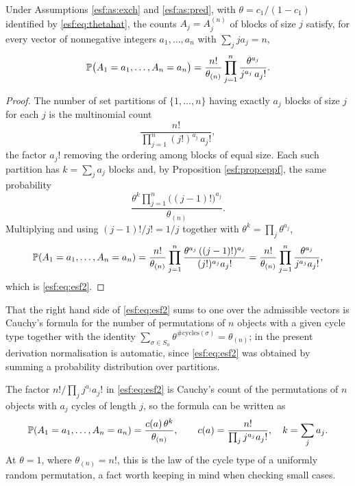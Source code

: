 \begin{theorem}
\label{esf:thm:esf}
Under Assumptions \ref{esf:as:exch} and \ref{esf:as:pred}, with $\theta = c_1/(1-c_1)$
identified by \eqref{esf:eq:thetahat}, the counts $A_j = A_j^{(n)}$ of blocks of size $j$
satisfy, for every vector of nonnegative integers $a_1, \dots, a_n$ with
$\sum_{j} j a_j = n$,
\begin{equation}
\mathbb{P}\bigl( A_1 = a_1, \dots, A_n = a_n \bigr)
= \frac{n!}{\theta_{(n)}} \prod_{j=1}^{n} \frac{\theta^{a_j}}{j^{a_j} \, a_j!}.
\label{esf:eq:esf2}
\end{equation}
\end{theorem}

\begin{proof}
The number of set partitions of $\{1,\dots,n\}$ having exactly $a_j$ blocks of size
$j$ for each $j$ is the multinomial count
\[
\frac{n!}{\prod_{j=1}^{n} (j!)^{a_j} \, a_j!},
\]
the factor $a_j!$ removing the ordering among blocks of equal size. Each such
partition has $k = \sum_j a_j$ blocks and, by Proposition \ref{esf:prop:eppf}, the same
probability
\[
\frac{\theta^{k} \prod_{j=1}^{n} \bigl( (j-1)! \bigr)^{a_j}}{\theta_{(n)}} .
\]
Multiplying and using $(j-1)!/j! = 1/j$ together with $\theta^{k} = \prod_j \theta^{a_j}$,
\[
\mathbb{P}(A_1 = a_1, \dots, A_n = a_n)
= \frac{n!}{\theta_{(n)}} \prod_{j=1}^{n} \frac{\theta^{a_j} \, ((j-1)!)^{a_j}}{(j!)^{a_j} a_j!}
= \frac{n!}{\theta_{(n)}} \prod_{j=1}^{n} \frac{\theta^{a_j}}{j^{a_j} a_j!},
\]
which is \eqref{esf:eq:esf2}.
\end{proof}

That the right hand side of \eqref{esf:eq:esf2} sums to one over the admissible vectors is
Cauchy's formula for the number of permutations of $n$ objects with a given cycle type
\citep{esf:arratia2003} together with the identity $\sum_{\sigma \in S_n} \theta^{\#\text{cycles}(\sigma)} =
\theta_{(n)}$; in the present derivation normalisation is automatic, since
\eqref{esf:eq:esf2} was obtained by summing a probability distribution over partitions.

The factor $n!/\prod_j j^{a_j} a_j!$ in \eqref{esf:eq:esf2} is Cauchy's count of the
permutations of $n$ objects with $a_j$ cycles of length $j$, so the formula can be
written as
\begin{equation}
\mathbb{P}(A_1 = a_1, \dots, A_n = a_n) = \frac{c(a)\,\theta^{k}}{\theta_{(n)}},
\qquad c(a) = \frac{n!}{\prod_{j} j^{a_j} a_j!}, \quad k = \sum_j a_j .
\label{esf:eq:esfcycle}
\end{equation}
At $\theta = 1$, where $\theta_{(n)} = n!$, this is the law of the cycle type of a
uniformly random permutation, a fact worth keeping in mind when checking small cases.

